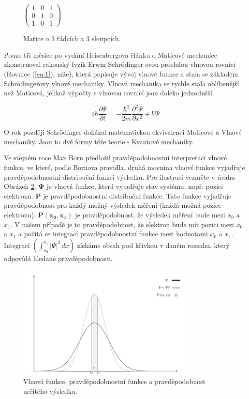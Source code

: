 \begin{figure}[ht]
    \centering
    $\begin{pmatrix}
    1 & 0 & 1 \\
    0 & 1 & 0 \\
    1 & 0 & 1
    \end{pmatrix}
    $
    \caption{\label{fig:1}Matice o 3 řádcích a 3 sloupcích.}
\end{figure}

Pouze tři měsíce po vydání Heisenbergova článku o Maticové mechanice zkonstruoval rakouský fyzik Erwin Schrödinger svou proslulou vlnovou rovnici (Rovnice (\ref{eq:1}), níže), která popisuje vývoj vlnové funkce a stala se základem Schrödingerovy vlnové mechaniky. Vlnová mechanika se rychle stala oblíbenější než Maticová, jelikož výpočty s vlnovou rovnicí jsou daleko jednodušší.

\begin{equation}
    i\hbar \frac{\partial \Psi}{\partial t} = -\frac{\hbar^2}{2m}
    \frac{\partial^2 \Psi}{\partial x^2} + V \Psi
    \label{eq:1}
\end{equation}

O rok později Schrödinger dokázal matematickou ekvivalenci Maticové a Vlnové mechaniky. Jsou to dvě formy téže teorie - Kvantové mechaniky.

Ve stejném roce Max Born předložil pravděpodobnostní interpretaci vlnové funkce, ve které, podle Bornova pravidla, druhá mocnina vlnové funkce vyjadřuje pravděpodobnostní distribuční funkci výsledku. Pro ilustraci vezměte v úvahu Obrázek \ref{fig:2}. $\bm{\Psi}$ je vlnová funkce, která vyjadřuje stav systému, např. pozici elektronu. \textbf{P} je pravděpodobnostní distribuční funkce. Tato funkce vyjadřuje pravděpodobnost pro každý možný výsledek měření (každá možná pozice elektronu). $\bm{P(x_0,x_1)}$ je pravděpodobnost, že výsledek měření bude mezi $x_0$ a $x_1$. V našem případě je to pravděpodobnost, že elektron bude mít pozici mezi $x_0$ a $x_1$ a počítá se integrací pravděpodobnost\-ní funkce mezi hodnotami $x_0$ a $x_1$. Integrací $(\int_{x_0}^{x_1}|\Psi|^2\,dx)$ získáme obsah pod křivkou v daném rozsahu, který odpovídá hledané pravděpodobnosti. 




\begin{figure}[ht]
\centering
\includegraphics[width=250pt]{images/probability-function.png}
\caption{\label{fig:2}Vlnová funkce, pravděpodobnostní funkce a pravděpodobnost určitého výsledku.}
\end{figure}

